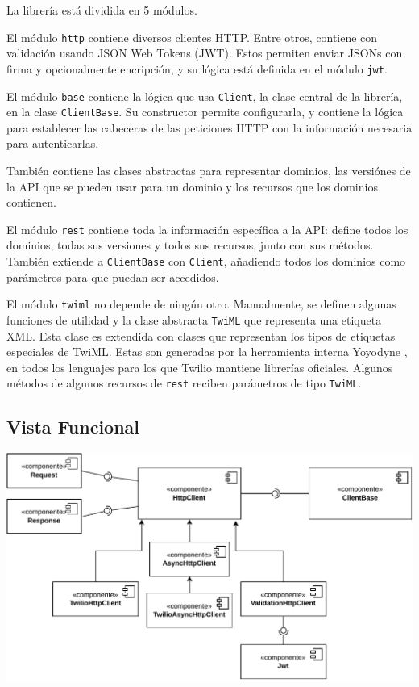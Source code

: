 \documentclass{article}
\begin{document}
La librería está dividida en 5 módulos.

\hfill

El módulo \verb|http| contiene diversos clientes HTTP.
Entre otros, contiene con validación usando JSON Web Tokens (JWT).
Estos permiten enviar JSONs con firma y opcionalmente encripción,
y su lógica está definida en el módulo \verb|jwt|.

\hfill

El módulo \verb|base| contiene
la lógica que usa \verb|Client|,
la clase central de la librería,
en la clase \verb|ClientBase|.
Su constructor permite configurarla,
y contiene la lógica para 
establecer las cabeceras de las peticiones HTTP
con la información necesaria para autenticarlas.

También contiene las clases abstractas
para representar dominios,
las versiónes de la API que se pueden usar para un dominio
y los recursos que los dominios contienen.

\hfill

El módulo \verb|rest|
contiene toda la información específica a la API:
define todos los dominios,
todas sus versiones y todos sus recursos,
junto con sus métodos.
También extiende a \verb|ClientBase| con \verb|Client|,
añadiendo todos los dominios como parámetros
para que puedan ser accedidos.

\hfill

El módulo \verb|twiml| no depende de ningún otro.
Manualmente, se definen algunas funciones de utilidad
y la clase abstracta \verb|TwiML|
que representa una etiqueta XML.
Esta clase es extendida
con clases que representan los tipos de etiquetas especiales de TwiML.
Estas son generadas por la herramienta interna Yoyodyne
\cite{twilio-generated-yoyodyne},
en todos los lenguajes para los que Twilio mantiene librerías oficiales.
Algunos métodos de algunos recursos de \verb|rest|
reciben parámetros de tipo \verb|TwiML|.


\subsection{Vista Funcional}

\hfill

\begin{center}
  \includegraphics[width=\textwidth]{VistaFuncionalClienteBase.pdf}
  \label{fig:vista funcional clientbase}
\end{center}
\end{document}
